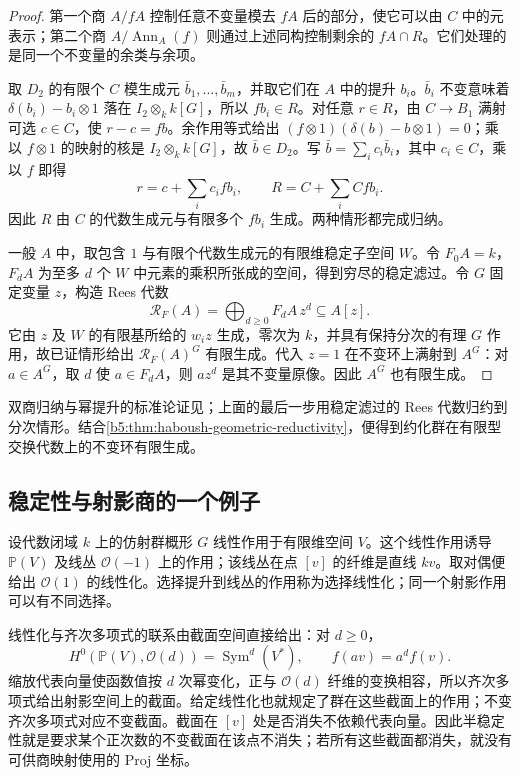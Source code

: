 \begin{proof}
	第一个商 \(A/fA\) 控制任意不变量模去 \(fA\) 后的部分，使它可以由 \(C\) 中的元表示；第二个商 \(A/\operatorname{Ann}_A(f)\) 则通过上述同构控制剩余的 \(fA\cap R\)。它们处理的是同一个不变量的余类与余项。

	取 \(D_2\) 的有限个 \(C\) 模生成元 \(\bar b_1,\ldots,\bar b_m\)，并取它们在 \(A\) 中的提升 \(b_i\)。\(\bar b_i\) 不变意味着 \(\delta(b_i)-b_i\otimes1\) 落在 \(I_2\otimes_k k[G]\)，所以 \(fb_i\in R\)。对任意 \(r\in R\)，由 \(C\to B_1\) 满射可选 \(c\in C\)，使 \(r-c=fb\)。余作用等式给出 \((f\otimes1)(\delta(b)-b\otimes1)=0\)；乘以 \(f\otimes1\) 的映射的核是 \(I_2\otimes_k k[G]\)，故 \(\bar b\in D_2\)。写 \(\bar b=\sum_i c_i\bar b_i\)，其中 \(c_i\in C\)，乘以 \(f\) 即得
	\[
		r=c+\sum_i c_i fb_i,\qquad R=C+\sum_i Cfb_i.
	\]
	因此 \(R\) 由 \(C\) 的代数生成元与有限多个 \(fb_i\) 生成。两种情形都完成归纳。

	一般 \(A\) 中，取包含 \(1\) 与有限个代数生成元的有限维稳定子空间 \(W\)。令 \(F_0A=k\)，\(F_dA\) 为至多 \(d\) 个 \(W\) 中元素的乘积所张成的空间，得到穷尽的稳定滤过。令 \(G\) 固定变量 \(z\)，构造 Rees 代数
	\[
		\mathcal R_F(A)=\bigoplus_{d\ge0}F_dA\,z^d\subseteq A[z].
	\]
	它由 \(z\) 及 \(W\) 的有限基所给的 \(w_i z\) 生成，零次为 \(k\)，并具有保持分次的有理 \(G\) 作用，故已证情形给出 \(\mathcal R_F(A)^G\) 有限生成。代入 \(z=1\) 在不变环上满射到 \(A^G\)：对 \(a\in A^G\)，取 \(d\) 使 \(a\in F_dA\)，则 \(az^d\) 是其不变量原像。因此 \(A^G\) 也有限生成。
\end{proof}

双商归纳与幂提升的标准论证见\cite[Section 3.4, Theorem 3.3 and Lemma 3.5]{Dolgachev2003InvariantTheory}；上面的最后一步用稳定滤过的 Rees 代数归约到分次情形。结合\cref{b5:thm:haboush-geometric-reductivity}，便得到约化群在有限型交换代数上的不变环有限生成。

\subsection{稳定性与射影商的一个例子}
\label{b5:subsec:2207:03}

设代数闭域 \(k\) 上的仿射群概形 \(G\) 线性作用于有限维空间 \(V\)。这个线性作用诱导 \(\mathbb P(V)\) 及线丛 \(\mathcal O(-1)\) 上的作用；该线丛在点 \([v]\) 的纤维是直线 \(kv\)。取对偶便给出 \(\mathcal O(1)\) 的线性化。选择提升到线丛的作用称为选择线性化；同一个射影作用可以有不同选择。

\ProseParagraphBreak
线性化与齐次多项式的联系由截面空间直接给出：对 \(d\ge0\)，
\[
	H^0(\mathbb P(V),\mathcal O(d))=\operatorname{Sym}^d(V^*), \qquad f(av)=a^df(v).
\]
缩放代表向量使函数值按 \(d\) 次幂变化，正与 \(\mathcal O(d)\) 纤维的变换相容，所以齐次多项式给出射影空间上的截面。给定线性化也就规定了群在这些截面上的作用；不变齐次多项式对应不变截面。截面在 \([v]\) 处是否消失不依赖代表向量。因此半稳定性就是要求某个正次数的不变截面在该点不消失；若所有这些截面都消失，就没有可供商映射使用的 Proj 坐标。

